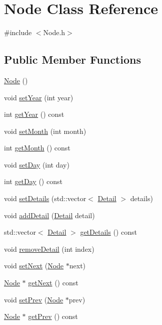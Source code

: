 \hypertarget{classNode}{\section{Node Class Reference}
\label{classNode}
}


{\ttfamily \#include $<$Node.\-h$>$}

\subsection*{Public Member Functions}
\begin{DoxyCompactItemize}
\item 
\hyperlink{classNode_ad7a34779cad45d997bfd6d3d8043c75f}{Node} ()
\item 
void \hyperlink{classNode_abd3420118a8a964e0678d1a975039e1f}{set\-Year} (int year)
\item 
int \hyperlink{classNode_af15e4c90d35d5664f635955e80f316ea}{get\-Year} () const 
\item 
void \hyperlink{classNode_ad8e3dddfff350a83c7f1026ffe346e62}{set\-Month} (int month)
\item 
int \hyperlink{classNode_a18e3c720f06e64b2cdcbef3b352a475b}{get\-Month} () const 
\item 
void \hyperlink{classNode_aa6c9c8301e00180ae43100eb9c1ac458}{set\-Day} (int day)
\item 
int \hyperlink{classNode_ae962d807d779d4fe8e4c297db3ce3466}{get\-Day} () const 
\item 
void \hyperlink{classNode_ac92cdd0b0fd1fb089ca345487cc9f131}{set\-Details} (std\-::vector$<$ \hyperlink{classDetail}{Detail} $>$ details)
\item 
void \hyperlink{classNode_ac80487a89a299a21570ab5674c15ed9c}{add\-Detail} (\hyperlink{classDetail}{Detail} detail)
\item 
std\-::vector$<$ \hyperlink{classDetail}{Detail} $>$ \hyperlink{classNode_a61140047453e85de625dbbd3fb80cdcf}{get\-Details} () const 
\item 
void \hyperlink{classNode_a1f233dbcd9ecd73c194b4e629ff08564}{remove\-Detail} (int index)
\item 
void \hyperlink{classNode_ae0062432733265c491000494625c3a04}{set\-Next} (\hyperlink{classNode}{Node} $\ast$next)
\item 
\hyperlink{classNode}{Node} $\ast$ \hyperlink{classNode_a62ad5aae1f815deafcf6095770dae6ca}{get\-Next} () const 
\item 
void \hyperlink{classNode_a169576a90ab0bd0706491c445616c909}{set\-Prev} (\hyperlink{classNode}{Node} $\ast$prev)
\item 
\hyperlink{classNode}{Node} $\ast$ \hyperlink{classNode_a63e648d1474c02f14c6147e7a96f430e}{get\-Prev} () const 
\end{DoxyCompactItemize}
